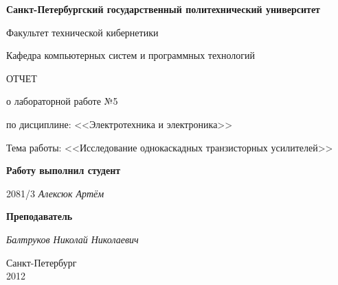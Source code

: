 \begin{titlepage}
\begin{center}

\textbf{Санкт-Петербургский государственный политехнический университет}

\vspace{5mm}
Факультет технической кибернетики

\vspace{5mm}
Кафедра компьютерных систем и программных технологий

\vspace*{\fill}

\huge{ОТЧЕТ}

\Large{о лабораторной работе №5}

\large{по дисциплине: <<Электротехника и электроника>>}

\vspace*{2mm}
\large{Тема работы: <<Исследование однокаскадных транзисторных усилителей>>}

\vspace*{\fill}
\end{center}

\begin{large}
\hspace{0.4\linewidth} \textbf{Работу выполнил студент}

\vspace{5mm}
\hspace{0.4\linewidth} 2081/3 \hspace{1cm} \textit{Алексюк Артём}

\vspace{3mm}
\hspace{0.4\linewidth} \textbf{Преподаватель}

\vspace{5mm}
\hspace{0.4\linewidth} \underline{\hspace{2cm} } \hspace{3mm} \textit{Балтруков Николай Николаевич}
\end{large}

\vspace*{3cm}

\begin{center}
\normalsize Санкт-Петербург\\2012
\end{center}
\end{titlepage}